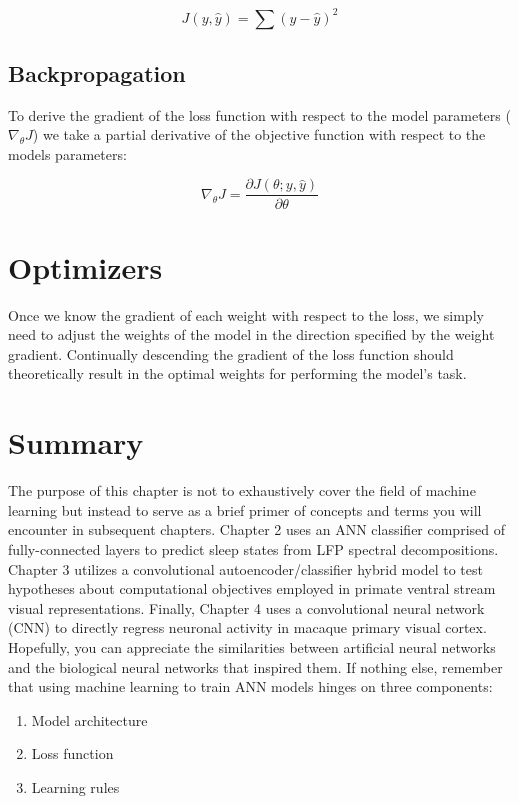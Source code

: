 \documentclass{templates/ucdenverthesis}
\begin{document}
\[
J(y,\hat{y}) = \sum (y-\hat{y})^2
\]

\hypertarget{sec:backprop}{%
\subsection{Backpropagation}\label{sec:backprop}}

To derive the gradient of the loss function with respect to the model parameters (\(\nabla_{\theta} J\)) we take a partial derivative of the objective function with respect to the models parameters:

\[
\nabla_{\theta} J = \frac{\partial J(\theta ; y, \hat{y})}{\partial \theta}
\]

\hypertarget{sec:optimizers}{%
\section{Optimizers}\label{sec:optimizers}}

Once we know the gradient of each weight with respect to the loss, we simply need to adjust the weights of the model in the direction specified by the weight gradient. Continually descending the gradient of the loss function should theoretically result in the optimal weights for performing the model's task.

\hypertarget{sec:ch2summary}{%
\section{Summary}\label{sec:ch2summary}}

The purpose of this chapter is not to exhaustively cover the field of machine learning but instead to serve as a brief primer of concepts and terms you will encounter in subsequent chapters. Chapter 2 uses an ANN classifier comprised of fully-connected layers to predict sleep states from LFP spectral decompositions. Chapter 3 utilizes a convolutional autoencoder/classifier hybrid model to test hypotheses about computational objectives employed in primate ventral stream visual representations.
Finally, Chapter 4 uses a convolutional neural network (CNN) to directly regress neuronal activity in macaque primary visual cortex.
Hopefully, you can appreciate the similarities between artificial neural networks and the biological neural networks that inspired them. If nothing else, remember that using machine learning to train ANN models hinges on three components:

\begin{enumerate}
\def\labelenumi{\arabic{enumi})}
\tightlist
\item
  Model architecture
\item
  Loss function
\item
  Learning rules
\end{enumerate}
\end{document}
